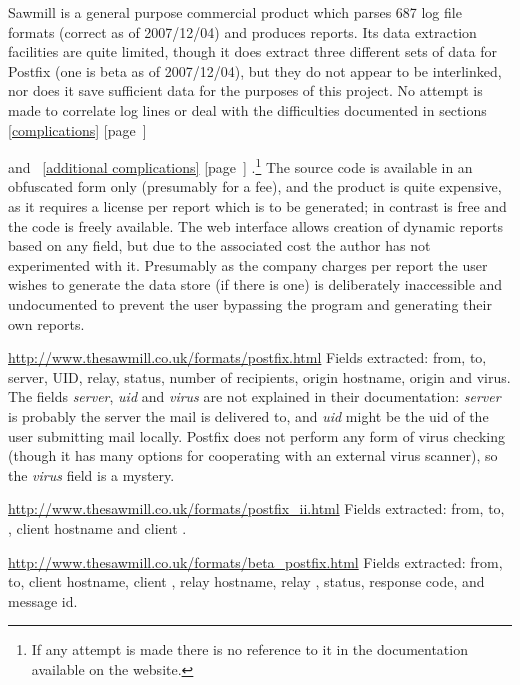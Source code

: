 \documentclass[a4paper,12pt,draft]{article}
\newcommand{\parsername}{\PLP{}}
\newcommand{\refwithpage}[1]{%
    \empty{}\ref{#1} [page~\pageref{#1}]%
}
\begin{document}
\begin{description}
        Sawmill is a general purpose commercial product which parses 687
        log file formats (correct as of 2007/12/04) and produces reports.
        Its data extraction facilities are quite limited, though it does
        extract three different sets of data for Postfix (one is beta as of
        2007/12/04), but they do not appear to be interlinked, nor does it
        save sufficient data for the purposes of this project.  No attempt
        is made to correlate log lines or deal with the difficulties
        documented in sections~\refwithpage{complications}
        and~\refwithpage{additional complications}.\footnote{If any attempt
        is made there is no reference to it in the documentation available
        on the website.} The source code is available in an obfuscated form
        only (presumably for a fee), and the product is quite expensive, as
        it requires a license per report which is to be generated; in
        contrast \parsername{} is free and the code is freely available.
        The web interface allows creation of dynamic reports based on any
        field, but due to the associated cost the author has not
        experimented with it.  Presumably as the company charges per report
        the user wishes to generate the data store (if there is one) is
        deliberately inaccessible and undocumented to prevent the user
        bypassing the program and generating their own reports.

        \url{http://www.thesawmill.co.uk/formats/postfix.html} \newline
        Fields extracted: from, to, server, UID, relay, status, number of
        recipients, origin hostname, origin \IP{} and virus.  The fields
        \textit{server}, \textit{uid\/} and \textit{virus\/} are not
        explained in their documentation: \textit{server\/} is probably the
        server the mail is delivered to, and \textit{uid\/} might be the
        uid of the user submitting mail locally.  Postfix does not perform
        any form of virus checking (though it has many options for
        cooperating with an external virus scanner), so the
        \textit{virus\/} field is a mystery.

        \url{http://www.thesawmill.co.uk/formats/postfix_ii.html} \newline
        Fields extracted: from, to, \RBL{}, client hostname and client
        \IP{}\@.

        \url{http://www.thesawmill.co.uk/formats/beta_postfix.html}
        \newline Fields extracted: from, to, client hostname, client \IP{},
        relay hostname, relay \IP{}, status, response code, \RBL{} and
        message id.


\end{description}
\end{document}

